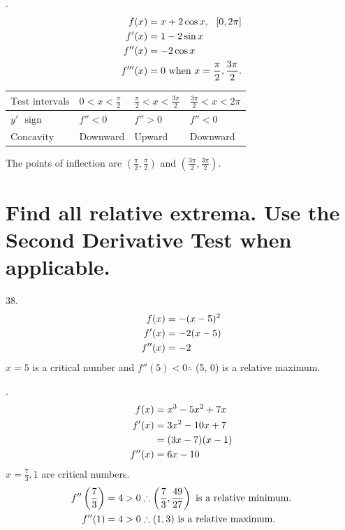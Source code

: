 \documentclass[11pt]{article}
\newcommand*{\vs}{\vspace{1cm}}
\newcommand*{\next}{\noindent}
\newcommand*{\set}{\setcounter{equation}{0}}
\begin{document}
\vs
\next
36.\begin{align}
    \set
    f(x)&=x+2\cos x,\,\,\,\,[0, 2\pi]\\
    f'(x)&=1-2\sin x\\
    f''(x)&=-2\cos x\\
    f'''(x)&=0\,\,\text{when}\,\, x=\frac{\pi}{2}, \frac{3\pi}{2}.
\end{align}
\begin{flushleft}
    \begin{table}[h]
        \begin{tabular}{|l|l|l|l|}
        \hline
        $\text{Test intervals}$ & $0<x<\frac{\pi}{2}$ & $\frac{\pi}{2}<x<\frac{3\pi}{2}$ & $\frac{3\pi}{2}<x<2\pi$\\ \hline
        $y'\,\,\,\,\text{sign}$ & $f''<0$ & $f''>0$ & $f''<0$\\ \hline
        $\text{Concavity}$ & Downward & Upward & Downward\\
        \hline
        \end{tabular}
    \end{table}
\end{flushleft}
The points of inflection are $\left(\frac{\pi}{2},\frac{\pi}{2}\right)$ and $\left(\frac{3\pi}{2}, \frac{3\pi}{2}\right)$.

\section{Find all relative extrema. Use the Second Derivative Test when applicable.}
38.\begin{align}
    \set
    f(x)&=-(x-5)^2\\
    f'(x)&=-2(x-5)\\
    f''(x)&=-2
\end{align}
$x=5$ is a critical number and $f''(5)<0\therefore$ (5, 0) is a relative maximum.

\vs
\next
42.\begin{align}
    \set
    f(x)&=x^3-5x^2+7x\\
    f'(x)&=3x^2-10x+7\\
    &=(3x-7)(x-1)\\
    f''(x)&=6x-10
\end{align}
$x=\frac{7}{3}, 1$ are critical numbers.
\begin{align}
    \set
    f''\left(\frac{7}{3}\right)&=4>0\therefore\left(\frac{7}{3}, \frac{49}{27}\right)\,\,\text{is a relative minimum.}\\
    f''(1)&=4>0\therefore(1, 3)\,\,\text{is a relative maximum.}
\end{align}
\end{document}
